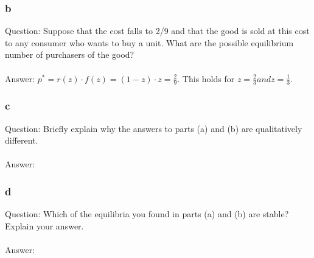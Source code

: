 \documentclass[12pt]{scrartcl}
\begin{document}
\subsubsection*{b}
Question: Suppose that the cost falls to 2/9 and that the good is sold at this cost to any consumer who wants to buy a unit. What are the possible equilibrium number of
purchasers of the good?\\\\
Answer: $p^{*} = r(z)\cdot f(z) = (1-z)\cdot z = \frac{2}{9}$. This holds for $z = \frac{2}{3} and z = \frac{1}{3}$. 

\subsubsection*{c} 
Question: Briefly explain why the answers to parts (a) and (b) are qualitatively different.\\\\
Answer: 

\subsubsection*{d}
Question: Which of the equilibria you found in parts (a) and (b) are stable? Explain your answer.\\\\
Answer: 
\end{document}
